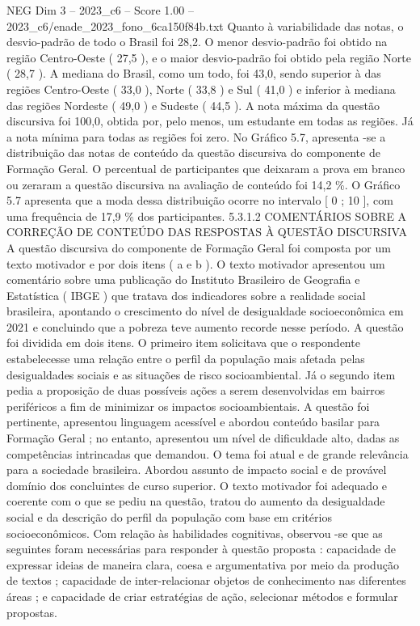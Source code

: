 \begin{textsample}{NEG Dim 3 – 2023\_c6 – Score 1.00 – 2023\_c6/enade\_2023\_fono\_6ca150f84b.txt}
Quanto à variabilidade das notas, o desvio-padrão de todo o Brasil foi 28,2.
O menor desvio-padrão foi obtido na região Centro-Oeste ( 27,5 ), e o maior desvio-padrão foi obtido pela região Norte ( 28,7 ).
A mediana do Brasil, como um todo, foi 43,0, sendo superior à das regiões Centro-Oeste ( 33,0 ), Norte ( 33,8 ) e Sul ( 41,0 ) e inferior à mediana das regiões Nordeste ( 49,0 ) e Sudeste ( 44,5 ).
A nota máxima da questão discursiva foi 100,0, obtida por, pelo menos, um estudante em todas as regiões.
Já a nota mínima para todas as regiões foi zero.
No Gráfico 5.7, apresenta -se a distribuição das notas de conteúdo da questão discursiva do componente de Formação Geral.
O percentual de participantes que deixaram a prova em branco ou zeraram a questão discursiva na avaliação de conteúdo foi 14,2 \%.
O Gráfico 5.7 apresenta que a moda dessa distribuição ocorre no intervalo [ 0 ; 10 ], com uma frequência de 17,9 \% dos participantes. 5.3.1.2 COMENTÁRIOS SOBRE A CORREÇÃO DE CONTEÚDO DAS RESPOSTAS À QUESTÃO DISCURSIVA A questão discursiva do componente de Formação Geral foi composta por um texto motivador e por dois itens ( a e b ).
O texto motivador apresentou um comentário sobre uma publicação do Instituto Brasileiro de Geografia e Estatística ( IBGE ) que tratava dos indicadores sobre a realidade social brasileira, apontando o crescimento do nível de desigualdade socioeconômica em 2021 e concluindo que a pobreza teve aumento recorde nesse período.
A questão foi dividida em dois itens.
O primeiro item solicitava que o respondente estabelecesse uma relação entre o perfil da população mais afetada pelas desigualdades sociais e as situações de risco socioambiental.
Já o segundo item pedia a proposição de duas possíveis ações a serem desenvolvidas em bairros periféricos a fim de minimizar os impactos socioambientais.
A questão foi pertinente, apresentou linguagem acessível e abordou conteúdo basilar para Formação Geral ; no entanto, apresentou um nível de dificuldade alto, dadas as competências intrincadas que demandou.
O tema foi atual e de grande relevância para a sociedade brasileira.
Abordou assunto de impacto social e de provável domínio dos concluintes de curso superior.
O texto motivador foi adequado e coerente com o que se pediu na questão, tratou do aumento da desigualdade social e da descrição do perfil da população com base em critérios socioeconômicos.
Com relação às habilidades cognitivas, observou -se que as seguintes foram necessárias para responder à questão proposta : capacidade de expressar ideias de maneira clara, coesa e argumentativa por meio da produção de textos ; capacidade de inter-relacionar objetos de conhecimento nas diferentes áreas ; e capacidade de criar estratégias de ação, selecionar métodos e formular propostas.

\end{textsample}
